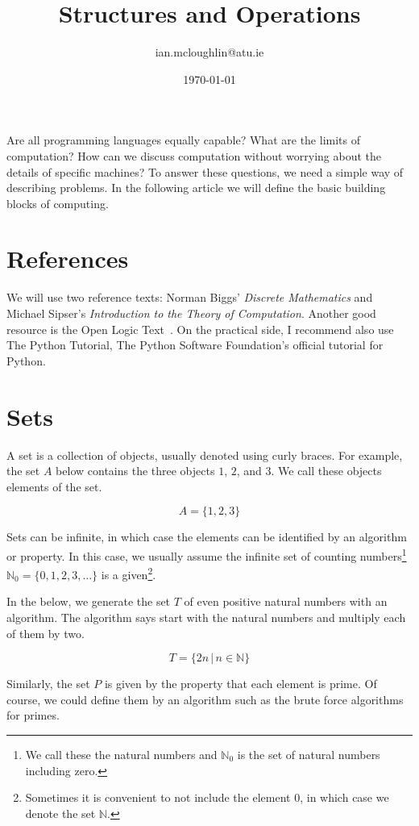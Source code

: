 \documentclass{iansnotes}
\title{Structures and Operations}
\author{ian.mcloughlin@atu.ie}
\date{\today}
\begin{document}
\maketitle

Are all programming languages equally capable?
What are the limits of computation?
How can we discuss computation without worrying about the details of specific machines?
To answer these questions, we need a simple way of describing problems.
In the following article we will define the basic building blocks of computing.


\section{References}
  We will use two reference texts: Norman Biggs' \emph{Discrete Mathematics}\autocite{biggs} and Michael Sipser's \emph{Introduction to the Theory of Computation}\autocite{sipser}.
  Another good resource is the Open Logic Text~\autocite{openlogictext}.
  On the practical side, I recommend also use The Python Tutorial\autocite{pythontutorial}, The Python Software Foundation's official tutorial for Python.


\section{Sets} 
  A set is a collection of objects, usually denoted using curly braces\autocite[3]{sipser}.
  For example, the set $A$ below contains the three objects $1$, $2$, and $3$.
  We call these objects elements of the set.

  $$ A = \{ 1, 2, 3 \} $$

  Sets can be infinite, in which case the elements can be identified by an algorithm or property.
  In this case, we usually assume the infinite set of counting numbers\footnote{We call these the natural numbers and $\mathbb{N}_0$ is the set of natural numbers including zero.} $\mathbb{N}_0 = \{ 0, 1, 2, 3, \ldots \}$ is a given\footnote{Sometimes it is convenient to not include the element $0$, in which case we denote the set $\mathbb{N}$.}.

  In the below, we generate the set $T$ of even positive natural numbers with an algorithm.
  The algorithm says start with the natural numbers and multiply each of them by two.

  $$ T = \{ 2n \, | \, n \in \mathbb{N} \} $$
  
  Similarly, the set $P$ is given by the property that each element is prime.
  Of course, we could define them by an algorithm such as the brute force algorithms for primes.
  
\end{document}
